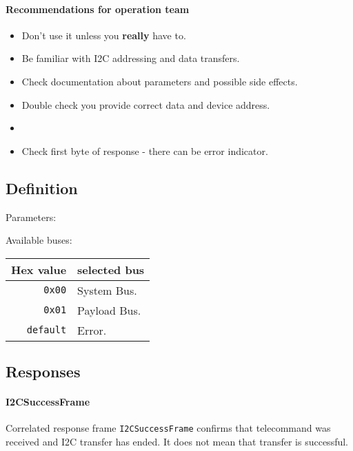 \paragraph{Recommendations for operation team}
\begin{itemize}
    \item Don't use it unless you \textbf{really} have to.
    \item Be familiar with I2C addressing and data transfers.
    \item Check documentation about parameters and possible side effects.
	\item Double check you provide correct data and device address.
	\item {}
	\item Check first byte of response - there can be error indicator.
\end{itemize}

\subsection{Definition}

Parameters: 

\begin{tcarglist}
\end{tcarglist}

Available buses:

\begin{tabular}{r | l}
	Hex value & selected bus \\ \hline
	\texttt{0x00} & System Bus. \\
	\texttt{0x01} & Payload Bus. \\
	\texttt{default} & Error. 
\end{tabular}

\subsection{Responses}

\paragraph{I2CSuccessFrame}
Correlated response frame \texttt{I2CSuccessFrame} confirms that telecommand was received and I2C transfer has ended. It does not mean that transfer is successful.

